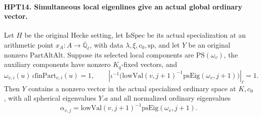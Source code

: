 \paragraph{HPT14. Simultaneous local eigenlines give an actual global ordinary vector.}
\label{claim:HPT14}
Let $H$ be the original Hecke setting, let $\mathrm{IsSpec}$ be
its actual specialization at an arithmetic point $x_A:A\to
\overline{\mathbb Q}_\ell$, with data $\lambda,\xi,c_0,\mathrm{sp}$,
and let $Y$ be an original nonzero $\mathrm{PartAltAlt}$.
Suppose its selected local components are $\mathrm{PS}(\omega_v)$,
the auxiliary components have nonzero $K_q$-fixed vectors, and
\[
 \omega_{v,i}(u)\,\iota\mathrm{finPart}_{v,i}(u)=1,\qquad
 \left|\iota^{-1}\bigl(\mathrm{lowVal}(v,j+1)^{-1}
                 \mathrm{psEig}(\omega_v,j+1)\bigr)\right|_\ell=1.
                                                               \tag{HPT.12}
\]
Then $Y$ contains a nonzero vector in the actual specialized
ordinary space at $K,c_0$, with all spherical eigenvalues $Y.a$
and all normalized ordinary eigenvalues
\[
             \alpha_{v,j}=\mathrm{lowVal}(v,j+1)^{-1}
                                     \mathrm{psEig}(\omega_v,j+1).
                                                               \tag{HPT.13}
\]
